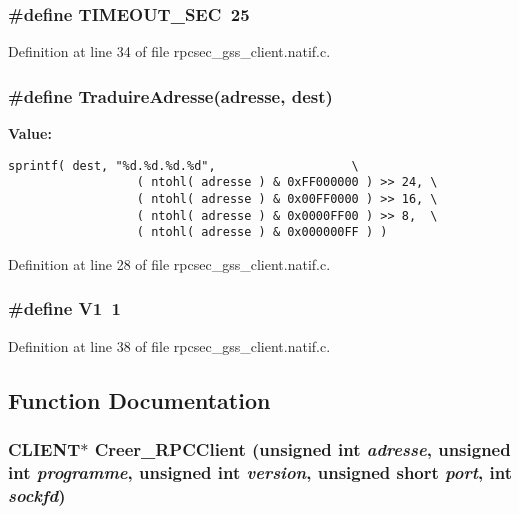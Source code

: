 \subsubsection{\setlength{\rightskip}{0pt plus 5cm}\#define TIMEOUT\_\-SEC\ 25}\label{rpcsec__gss__client_8natif_8c_a1}




Definition at line 34 of file rpcsec\_\-gss\_\-client.natif.c.
\subsubsection{\setlength{\rightskip}{0pt plus 5cm}\#define Traduire\-Adresse(adresse, dest)}\label{rpcsec__gss__client_8natif_8c_a0}


{\bf Value:}

\footnotesize\begin{verbatim}sprintf( dest, "%d.%d.%d.%d",                   \
                  ( ntohl( adresse ) & 0xFF000000 ) >> 24, \
                  ( ntohl( adresse ) & 0x00FF0000 ) >> 16, \
                  ( ntohl( adresse ) & 0x0000FF00 ) >> 8,  \
                  ( ntohl( adresse ) & 0x000000FF ) )
\end{verbatim}\normalsize 


Definition at line 28 of file rpcsec\_\-gss\_\-client.natif.c.
\subsubsection{\setlength{\rightskip}{0pt plus 5cm}\#define V1\ 1}\label{rpcsec__gss__client_8natif_8c_a5}




Definition at line 38 of file rpcsec\_\-gss\_\-client.natif.c.

\subsection{Function Documentation}
\subsubsection{\setlength{\rightskip}{0pt plus 5cm}CLIENT$\ast$ Creer\_\-RPCClient (unsigned int {\em adresse}, unsigned int {\em programme}, unsigned int {\em version}, unsigned short {\em port}, int {\em sockfd})}\label{rpcsec__gss__client_8natif_8c_a14}




